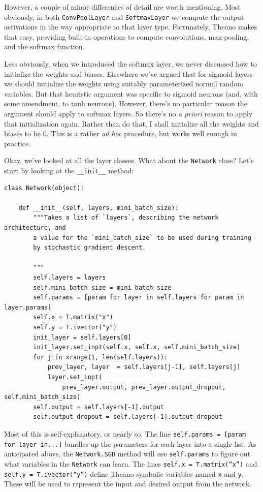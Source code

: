 However, a couple of minor differences of detail are worth mentioning. Most obviously, in both \texttt{ConvPoolLayer} and \texttt{SoftmaxLayer} we compute the output activations in the way appropriate to that layer type. Fortunately, Theano makes that easy, providing built-in operations to compute convolutions, max-pooling, and the softmax function.


Less obviously, when we introduced the softmax layer, we never discussed how to initialize the weights and biases. Elsewhere we've argued that for sigmoid layers we should initialize the weights using suitably parameterized normal random variables. But that heuristic argument was specific to sigmoid neurons (and, with some amendment, to tanh neurons). However, there's no particular reason the argument should apply to softmax layers. So there's no \emph{a priori} reason to apply that initialization again. Rather than do that, I shall initialize all the weights and biases to be $0$. This is a rather \emph{ad hoc} procedure, but works well enough in practice.


Okay, we've looked at all the layer classes. What about the \texttt{Network} class? Let's start by looking at the \texttt{\_\allowbreak{}\_\allowbreak{}init\_\allowbreak{}\_\allowbreak{}} method:



\begin{lstlisting}
class Network(object):
    
    def __init__(self, layers, mini_batch_size):
        """Takes a list of `layers`, describing the network architecture, and
        a value for the `mini_batch_size` to be used during training
        by stochastic gradient descent.

        """
        self.layers = layers
        self.mini_batch_size = mini_batch_size
        self.params = [param for layer in self.layers for param in layer.params]
        self.x = T.matrix("x")  
        self.y = T.ivector("y")
        init_layer = self.layers[0]
        init_layer.set_inpt(self.x, self.x, self.mini_batch_size)
        for j in xrange(1, len(self.layers)):
            prev_layer, layer  = self.layers[j-1], self.layers[j]
            layer.set_inpt(
                prev_layer.output, prev_layer.output_dropout, self.mini_batch_size)
        self.output = self.layers[-1].output
        self.output_dropout = self.layers[-1].output_dropout

\end{lstlisting}


Most of this is self-explanatory, or nearly so. The line \texttt{self.params = [param for layer in...]} bundles up the parameters for each layer into a single list. As anticipated above, the \texttt{Network.SGD} method will use \texttt{self.params} to figure out what variables in the \texttt{Network} can learn. The lines \texttt{self.x = T.matrix(``x'')} and \texttt{self.y = T.ivector(``y'')} define Theano symbolic variables named \texttt{x} and \texttt{y}. These will be used to represent the input and desired output from the network.


